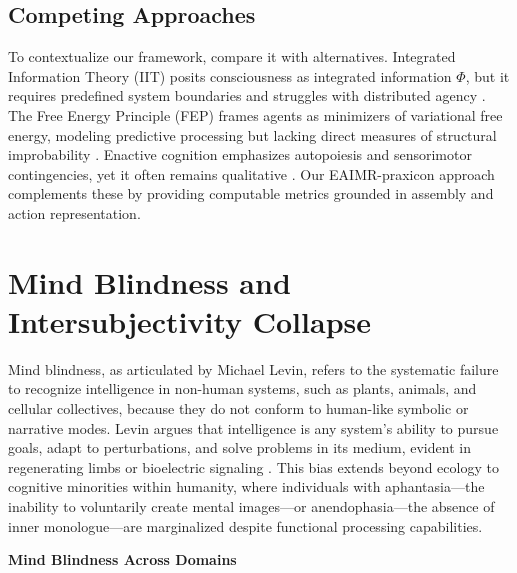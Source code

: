 \documentclass{article}
\begin{document}
\subsection{Competing Approaches}
To contextualize our framework, compare it with alternatives. Integrated Information Theory (IIT) posits consciousness as integrated information $\Phi$, but it requires predefined system boundaries and struggles with distributed agency \citep{tononi2004}. The Free Energy Principle (FEP) frames agents as minimizers of variational free energy, modeling predictive processing but lacking direct measures of structural improbability \citep{friston2010}. Enactive cognition emphasizes autopoiesis and sensorimotor contingencies, yet it often remains qualitative \citep{barandiaran2009}. Our EAIMR-praxicon approach complements these by providing computable metrics grounded in assembly and action representation.

\section{Mind Blindness and Intersubjectivity Collapse}
\label{sec:mind_blindness}

Mind blindness, as articulated by Michael Levin, refers to the systematic failure to recognize intelligence in non-human systems, such as plants, animals, and cellular collectives, because they do not conform to human-like symbolic or narrative modes. Levin argues that intelligence is any system’s ability to pursue goals, adapt to perturbations, and solve problems in its medium, evident in regenerating limbs or bioelectric signaling \citep{levin2019}. This bias extends beyond ecology to cognitive minorities within humanity, where individuals with aphantasia---the inability to voluntarily create mental images---or anendophasia---the absence of inner monologue---are marginalized despite functional processing capabilities.

\textbf{Mind Blindness Across Domains}
\end{document}
